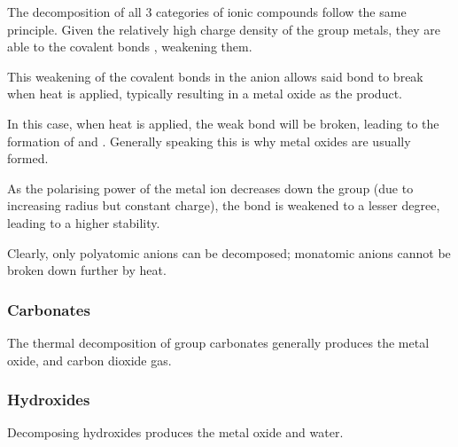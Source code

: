 			The decomposition of all 3 categories of ionic compounds follow the same principle. Given the
			relatively high charge density of the group \rtwo{} metals, they are able to  the
			covalent bonds , weakening them.

			This weakening of the covalent bonds in the anion allows said bond to break when heat is applied,
			typically resulting in a metal oxide as the product.



			In this case, when heat is applied, the weak bond will be broken, leading to the formation of
			 and . Generally speaking this is why metal oxides are usually formed.

			As the polarising power of the metal ion decreases down the group (due to increasing radius but
			constant charge), the bond is weakened to a lesser degree, leading to a higher stability.

			Clearly, only polyatomic anions can be decomposed; monatomic anions cannot be broken down further
			by heat.


			\subsubsection{Carbonates}

				The thermal decomposition of group \rtwo{} carbonates generally produces the metal oxide,
				and carbon dioxide gas.




			\subsubsection{Hydroxides}

				Decomposing hydroxides produces the metal oxide and water.

